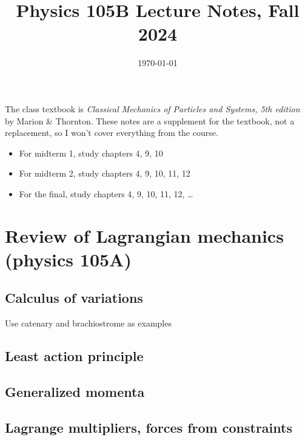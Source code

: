 \documentclass{article}
\date{\today}
\title{Physics 105B Lecture Notes, Fall 2024}
\begin{document}
\maketitle

The class textbook is \textit{Classical Mechanics of Particles and Systems, 5th edition} by Marion \& Thornton. These notes are a supplement for the textbook, not a replacement, so I won't cover everything from the course.
\begin{itemize}
    \item For midterm 1, study chapters 4, 9, 10
    \item For midterm 2, study chapters 4, 9, 10, 11, 12
    \item For the final, study chapters 4, 9, 10, 11, 12, \dots
\end{itemize}

\tableofcontents
\section{Review of Lagrangian mechanics (physics 105A)}
\subsection{Calculus of variations}
Use catenary and brachiostrome as examples
\subsection{Least action principle}
\subsection{Generalized momenta}
\subsection{Lagrange multipliers, forces from constraints}
\end{document}

